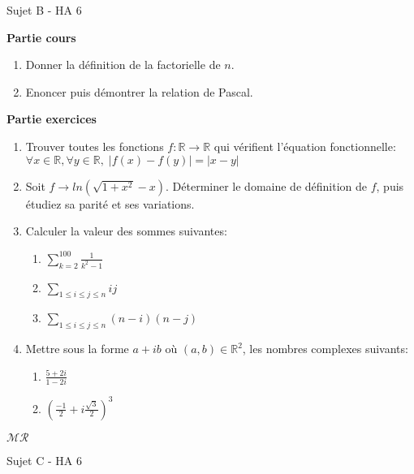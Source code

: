 \documentclass[a4paper,11pt, landscape]{article}
\begin{document}
\begin{multicols*}{4}
\vfill\null
\columnbreak
\centerline{Sujet B - HA 6}

\begin{flushleft}
  \textbf{Partie cours} 
\end{flushleft} 
\begin{enumerate}[leftmargin=*]
  \item Donner la définition de la factorielle de $n$.
  \item Enoncer puis démontrer la relation de Pascal.
\end{enumerate}
\textbf{Partie exercices}
\begin{enumerate}[leftmargin=*]
  \item Trouver toutes les fonctions $f : \mathbb{R} \rightarrow \mathbb{R}$ qui vérifient l'équation fonctionnelle: $\forall x \in \mathbb{R}, \forall y \in \mathbb{R}, \; |f(x) - f(y)| = |x - y|$
  \item Soit $f \rightarrow ln\left(\sqrt{1 + x^2} - x\right)$. Déterminer le domaine de définition de $f$, puis étudiez sa parité et ses variations.
\item Calculer la valeur des sommes suivantes:
\begin{enumerate}
  \item $\sum\limits_{k=2}^{100}\frac{1}{k^2-1}$
  \item $\sum\limits_{1\leq i \leq j \leq n}ij$
  \item $\sum\limits_{1\leq i \leq j \leq n}(n-i)(n-j)$
\end{enumerate}  
\item Mettre sous la forme $a + ib$ où $(a,b) \in \mathbb{R}^2$, les nombres complexes suivants:
\begin{enumerate}
  \item $\frac{5+2i}{1-2i}$
  \item $\left(\frac{-1}{2} + i\frac{\sqrt{3}}{2}\right)^3$
\end{enumerate}
\end{enumerate}
\centerline{$\mathcal{MR}$}
\vfill\null
\columnbreak
\centerline{Sujet C - HA 6}
\begin{flushleft}

\end{flushleft}
\end{multicols*}
\end{document}
